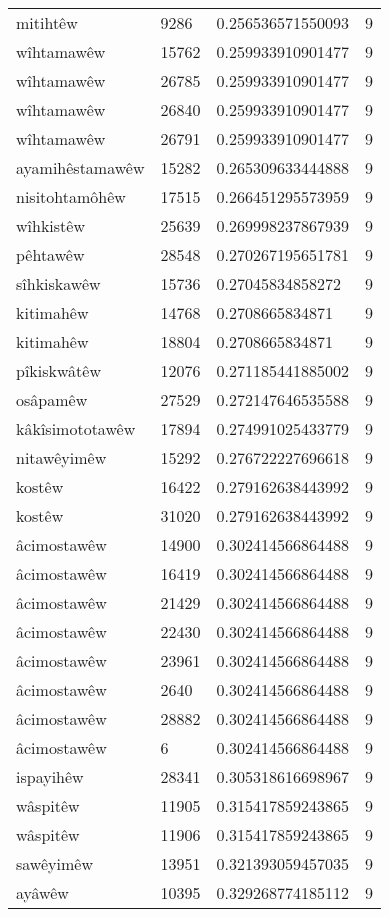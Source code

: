 \begin{longtable}{llll}
mitihtêw & 9286 & 0.256536571550093 & 9\\
wîhtamawêw & 15762 & 0.259933910901477 & 9\\
wîhtamawêw & 26785 & 0.259933910901477 & 9\\
wîhtamawêw & 26840 & 0.259933910901477 & 9\\
wîhtamawêw & 26791 & 0.259933910901477 & 9\\
ayamihêstamawêw & 15282 & 0.265309633444888 & 9\\
nisitohtamôhêw & 17515 & 0.266451295573959 & 9\\
wîhkistêw & 25639 & 0.269998237867939 & 9\\
pêhtawêw & 28548 & 0.270267195651781 & 9\\
sîhkiskawêw & 15736 & 0.27045834858272 & 9\\
kitimahêw & 14768 & 0.2708665834871 & 9\\
kitimahêw & 18804 & 0.2708665834871 & 9\\
pîkiskwâtêw & 12076 & 0.271185441885002 & 9\\
osâpamêw & 27529 & 0.272147646535588 & 9\\
kâkîsimototawêw & 17894 & 0.274991025433779 & 9\\
nitawêyimêw & 15292 & 0.276722227696618 & 9\\
kostêw & 16422 & 0.279162638443992 & 9\\
kostêw & 31020 & 0.279162638443992 & 9\\
âcimostawêw & 14900 & 0.302414566864488 & 9\\
âcimostawêw & 16419 & 0.302414566864488 & 9\\
âcimostawêw & 21429 & 0.302414566864488 & 9\\
âcimostawêw & 22430 & 0.302414566864488 & 9\\
âcimostawêw & 23961 & 0.302414566864488 & 9\\
âcimostawêw & 2640 & 0.302414566864488 & 9\\
âcimostawêw & 28882 & 0.302414566864488 & 9\\
âcimostawêw & 6 & 0.302414566864488 & 9\\
ispayihêw & 28341 & 0.305318616698967 & 9\\
wâspitêw & 11905 & 0.315417859243865 & 9\\
wâspitêw & 11906 & 0.315417859243865 & 9\\
sawêyimêw & 13951 & 0.321393059457035 & 9\\
ayâwêw & 10395 & 0.329268774185112 & 9\\

\end{longtable}
